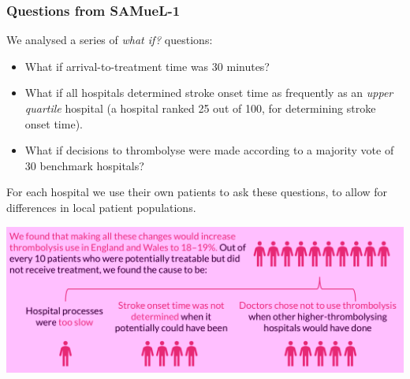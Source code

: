 \documentclass[xcolor={usenames,dvipsnames}]{beamer}
\begin{document}


\begin{frame}
\frametitle{Questions from SAMueL-1}

\footnotesize{We 
analysed a series of \emph{what if?} questions:}

\begin{itemize}
    \footnotesize
    \item What if arrival-to-treatment time was 30 minutes?
    \item What if all hospitals determined stroke onset time as frequently as an \emph{upper quartile} hospital (a hospital ranked 25 out of 100, for determining stroke onset time).
    \item What if decisions to thrombolyse were made according to a majority vote of 30 benchmark hospitals?
\end{itemize}

\footnotesize{For each hospital we use their own patients to ask these questions, to allow for differences in local patient populations.}







\begin{center}
\includegraphics[width=1.0\textwidth]{./images_pink/sam_summary_pt_3}
\end{center}

\end{frame}

\end{document}
